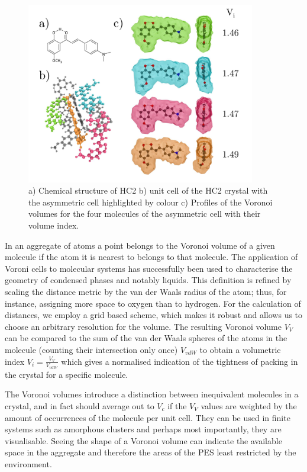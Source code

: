 \begin{figure}[ht]
\centering
  \includegraphics[width=10cm]{Chapters/6Implementation/vols.pdf}
  \caption{a) Chemical structure of HC2 b) unit cell of the HC2 crystal with the asymmetric cell highlighted by colour c) Profiles of the Voronoi volumes for the four molecules of the asymmetric cell with their volume index.}
  \label{fig:vols}
\end{figure}

In an aggregate of atoms a point belongs to the Voronoi volume of a given molecule if the atom it is nearest to belongs to that molecule. The application of Voroni cells\cite{Voronoi1907} to molecular systems has successfully been used to characterise the geometry of condensed phases\cite{Procacci1992} and notably liquids.\cite{Hunjan2010} This definition is refined by scaling the distance metric by the van der Waals radius of the atom; thus, for instance, assigning more space to oxygen than to hydrogen. For the calculation of distances, we employ a grid based scheme, which makes it robust and allows us to choose an arbitrary resolution for the volume.\cite{Abascal2013,Menzl2016} The resulting Voronoi volume $V_V$ can be compared to the sum of the van der Waals spheres of the atoms in the molecule (counting their intersection only once) $V_{vdW}$ to obtain a volumetric index $V_i = \frac{V_V}{V_{vdW}}$ which gives a normalised indication of the tightness of packing in the crystal for a specific molecule.

The Voronoi volumes introduce a distinction between inequivalent molecules in a crystal, and in fact should average out to $V_{c}$ if the $V_V$ values are weighted by the amount of occurrences of the molecule per unit cell. They can be used in finite systems such as amorphous clusters and perhaps most importantly, they are visualisable. Seeing the shape of a Voronoi volume can indicate the available space in the aggregate and therefore the areas of the PES least restricted by the environment.

